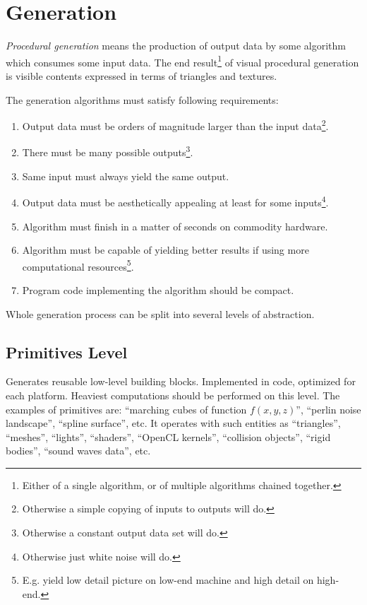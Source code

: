 \documentclass[12pt]{article}
\begin{document}
\section{Generation\label{Gen}}

\emph{Procedural generation} means the production of output data by some
algorithm which consumes some input data.
The end result\footnote{
    Either of a single algorithm, or of multiple algorithms chained together.
} of visual procedural generation is visible contents expressed in terms of
triangles and textures.

The generation algorithms must satisfy following requirements:

\begin{enumerate}
    \item
        Output data must be orders of magnitude larger than the input
        data\footnote{
            Otherwise a simple copying of inputs to outputs will do.
        }.
    \item
        There must be many possible outputs\footnote{
            Otherwise a constant output data set will do.
        }.
    \item
        Same input must always yield the same output.
    \item
        Output data must be aesthetically appealing at least for some
        inputs\footnote{
            Otherwise just white noise will do.
        }.
    \item
        Algorithm must finish in a matter of seconds on commodity hardware.
    \item
        Algorithm must be capable of yielding better results if using
        more computational resources\footnote{
            E.g. yield low detail picture on low-end machine and
            high detail on high-end.
        }.
    \item
        Program code implementing the algorithm should be compact.
\end{enumerate}

Whole generation process can be split into several levels of abstraction.

\subsection{Primitives Level\label{Prim}}

Generates reusable low-level building blocks.
Implemented in code, optimized for each platform.
Heaviest computations should be performed on this level.
The examples of primitives are: ``marching cubes of function \(f(x,y,z)\)'',
``perlin noise landscape'', ``spline surface'', etc.
It operates with such entities as ``triangles'', ``meshes'', ``lights'',
``shaders'', ``OpenCL kernels'', ``collision objects'', ``rigid bodies'',
``sound waves data'', etc.
\end{document}
